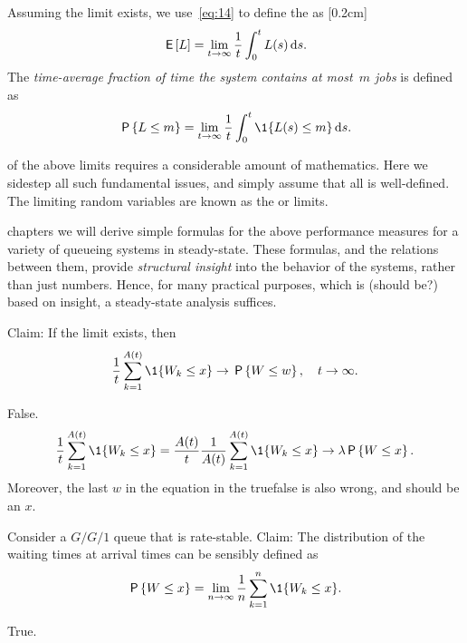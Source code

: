 \documentclass[stochastic-or.tex]{subfiles}
\begin{document}
Assuming the limit exists, we use~\cref{eq:14} to define the  as
[0.2cm]
\begin{equation} \label{eq:46}
 \,\mathsf{E}\left[L\right] = \lim_{t\to\infty} \frac 1 t\int_0^t L(s) \,\textrm{d}s.
\end{equation}
 The \emph{time-average fraction of time the system contains at most~$m$ jobs} is defined as
\begin{equation*}
 \P{\L\leq m} =\lim_{t\to\infty} \frac 1 t\int_0^t \1{\L(s)\leq m} \d s.
\end{equation*}

 of the above limits requires a considerable amount of mathematics.
Here we sidestep all such fundamental issues, and simply assume that all is well-defined.
The limiting random variables are known as the  or  limits.

 chapters we will derive simple formulas for the above performance measures for a variety of queueing systems in steady-state.
These formulas, and the relations between them, provide \emph{structural insight} into the behavior of the systems, rather than just numbers.
Hence, for many practical purposes, which is (should be?) based on insight, a steady-state analysis suffices.

\begin{truefalse}
Claim: If the limit exists, then
\begin{equation*}
 \frac{1}{t} \sum_{k=1}^{A(t)} \1{W_k \leq x} \to \P{W\leq w}, \quad t\to \infty.
\end{equation*}
\begin{solution}
False.
\begin{equation*}
 \frac{1}{t} \sum_{k=1}^{A(t)} \1{W_k \leq x} =
 \frac{A(t)}{t} \frac 1{A(t)}\sum_{k=1}^{A(t)} \1{W_k \leq x} \to \lambda \P{W\leq x}.
\end{equation*}
Moreover, the last $w$ in the equation in the truefalse is also wrong, and should be an $x$.
\end{solution}
\end{truefalse}

\begin{truefalse}
Consider a $G/G/1$ queue that is rate-stable. Claim: The distribution of the waiting times at
 arrival times can be sensibly defined as
\begin{equation*}
 \P{W \leq x} = \lim_{n\to\infty} \frac 1n\sum_{k=1}^n \1{W_k\leq x}.
\end{equation*}
\begin{solution}
True.
\end{solution}
\end{truefalse}
\end{document}
